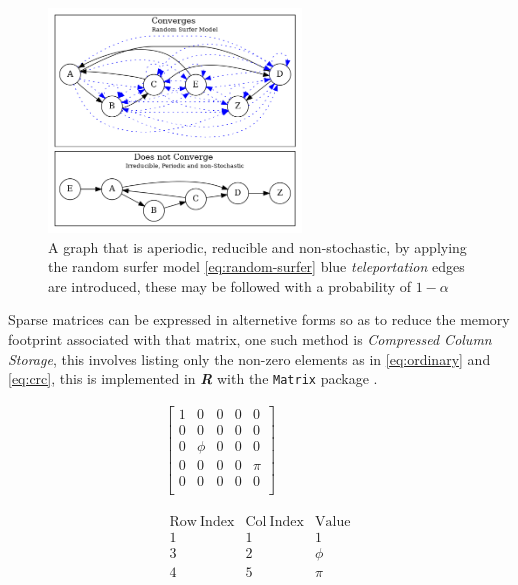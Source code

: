 \documentclass[11pt]{report}
\begin{document}
 \begin{figure}
 \includegraphics[width=0.6\textwidth]{media/dot/random_surfer.dot.png}
 \caption{\label{fig:rseg}A graph that is aperiodic, reducible and non-stochastic, by applying the random surfer model \eqref{eq:random-surfer} blue \emph{teleportation} edges are introduced, these may be followed with a probability of \(1 - \alpha\)}
 \end{figure}

Sparse matrices can be expressed in alternetive forms so as to reduce the memory
footprint associated with that matrix, one such method is \emph{Compressed Column
Storage}, this involves listing only the non-zero elements as in \eqref{eq:ordinary}
and \eqref{eq:crc}, this is implemented in \textbf{\emph{R}} with the \texttt{Matrix} package \cite{douglasbatesMatrixSparseDense2019}.

\begin{align}
    \begin{bmatrix}
	1 & 0 & 0 & 0 & 0 \\
	0 & 0 & 0 & 0 & 0 \\
	0 & \phi & 0 & 0 & 0 \\
	0 & 0 & 0 & 0 & \pi \\
	0 & 0 & 0 & 0 & 0 \\
    \end{bmatrix}  \label{eq:ordinary} \\
    \ \nonumber \\
    \ \nonumber \\
    \begin{matrix}
	\mathrm{Row\ Index} & \mathrm{Col\ Index} & \mathrm{Value}\\
	1 & 1 & 1 \\
	3 & 2 & \phi \\
	4 & 5 & \pi \\
    \end{matrix}  \label{eq:crc}
\end{align}
\end{document}
